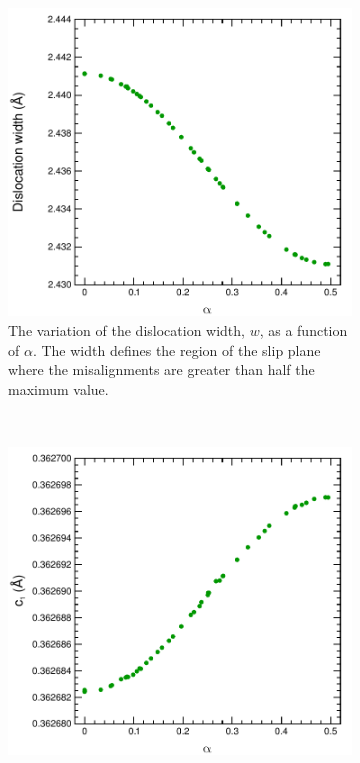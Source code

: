 \begin{figure}
\centering

\begin{subfigure}{0.45\textwidth}
\centering
\includegraphics[width=\textwidth]{w_vs_alpha}
\caption{The variation of the dislocation width, $w$, as a function of $\alpha$. The width defines the region of the slip plane where the misalignments are greater than half the maximum value.}
\end{subfigure}
~
\begin{subfigure}{0.45\textwidth}
\centering
\includegraphics[width=\textwidth]{c1_vs_alpha}

\end{subfigure}
\end{figure}

